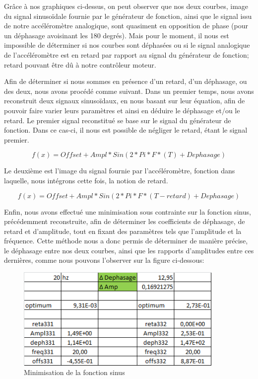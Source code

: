 \documentclass[french,a4paper,12pt]{report}
\begin{document}
 	Grâce à nos graphiques ci-dessus, on peut observer que nos deux courbes, image du signal sinusoïdale fournie par le générateur de fonction, ainsi que le signal issu de notre accéléromètre analogique, sont quasiment en opposition de phase (pour un déphasage avoisinant les 180 degrés). Mais pour le moment, il nous est impossible de déterminer si nos courbes sont déphasées ou si le signal analogique de l'accéléromètre est en retard par rapport au signal du générateur de fonction; retard pouvant être dû à notre contrôleur moteur.
 	
 	Afin de déterminer si nous sommes en présence d'un retard, d'un déphasage, ou des deux, nous avons procédé comme suivant.
 	Dans un premier temps, nous avons reconstruit deux signaux sinusoïdaux, en nous basant sur leur équation, afin de pouvoir faire varier leurs paramètres et ainsi en déduire le déphasage et/ou le retard.
 	Le premier signal reconstitué se base sur le signal du générateur de fonction. Dans ce cas-ci, il nous est possible de négliger le retard, étant le signal premier.
	
	\[	
		f(x) = Offset + Ampl * Sin( 2*Pi*F*(T) + Dephasage )
	\]	
	
	Le deuxième est l'image du signal fournie par l'accéléromètre, fonction dans laquelle, nous intégrons cette fois, la notion de retard.
	
	\[	
		f(x) = Offset + Ampl * Sin( 2*Pi*F*(T-retard) + Dephasage )
	\]	
	
	Enfin, nous avons effectué une minimisation sous contrainte sur la fonction sinus, précédemment reconstruite, afin de déterminer les coefficients de déphasage, de retard et d'amplitude, tout en fixant des paramètres tels que l'amplitude et la fréquence. Cette méthode nous a donc permis de déterminer de manière précise, le déphasage entre nos deux courbes, ainsi que les rapports d'amplitudes entre ces dernières, comme nous pouvons l'observer sur la figure ci-dessous:
	
	\begin{figure}[!ht]
    \center
  	\includegraphics[width=10cm]{dephAmp.png}
    \caption{Minimisation de la fonction sinus}
	\end{figure}	
	
\end{document}
